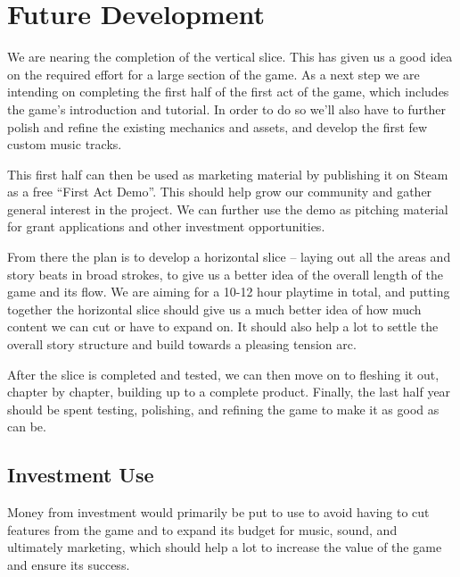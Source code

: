 \section{Future Development}\label{sec:future}
We are nearing the completion of the vertical slice. This has given us a good idea on the required effort for a large section of the game. As a next step we are intending on completing the first half of the first act of the game, which includes the game's introduction and tutorial. In order to do so we'll also have to further polish and refine the existing mechanics and assets, and develop the first few custom music tracks.

This first half can then be used as marketing material by publishing it on Steam as a free ``First Act Demo''. This should help grow our community and gather general interest in the project. We can further use the demo as pitching material for grant applications and other investment opportunities.

From there the plan is to develop a horizontal slice -- laying out all the areas and story beats in broad strokes, to give us a better idea of the overall length of the game and its flow. We are aiming for a 10-12 hour playtime in total, and putting together the horizontal slice should give us a much better idea of how much content we can cut or have to expand on. It should also help a lot to settle the overall story structure and build towards a pleasing tension arc.

After the slice is completed and tested, we can then move on to fleshing it out, chapter by chapter, building up to a complete product. Finally, the last half year should be spent testing, polishing, and refining the game to make it as good as can be.

\subsection{Investment Use}
Money from investment would primarily be put to use to avoid having to cut features from the game and to expand its budget for music, sound, and ultimately marketing, which should help a lot to increase the value of the game and ensure its success.

